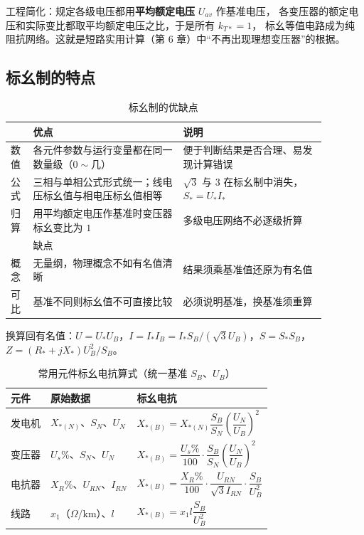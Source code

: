 工程简化：规定各级电压都用\textbf{平均额定电压} $U_{av}$ 作基准电压，
各变压器的额定电压和实际变比都取平均额定电压之比，于是所有 $k_{T*}=1$，
标幺等值电路成为纯阻抗网络。这就是短路实用计算（第 6 章）中“不再出现理想变压器”的根据。

\subsection{标幺制的特点}

\begin{table}[htbp]
  \centering
  \caption{标幺制的优缺点}
  \small
  \begin{tabular}{@{}p{0.06\linewidth}p{0.42\linewidth}p{0.40\linewidth}@{}}
    \toprule
     & 优点 & 说明 \\
    \midrule
    数值 & 各元件参数与运行变量都在同一数量级（$0\sim$几） & 便于判断结果是否合理、易发现计算错误 \\
    公式 & 三相与单相公式形式统一；线电压标幺值与相电压标幺值相等 &
           $\sqrt{3}$ 与 $3$ 在标幺制中消失，$S_*=U_*I_*$ \\
    归算 & 用平均额定电压作基准时变压器标幺变比为 $1$ & 多级电压网络不必逐级折算 \\
    \midrule
     & 缺点 & \\
    \midrule
    概念 & 无量纲，物理概念不如有名值清晰 & 结果须乘基准值还原为有名值 \\
    可比 & 基准不同则标幺值不可直接比较 & 必须说明基准，换基准须重算 \\
    \bottomrule
  \end{tabular}
\end{table}

换算回有名值：$U=U_*U_B$，$I=I_*I_B=I_*S_B/(\sqrt{3}U_B)$，$S=S_*S_B$，
$Z=(R_*+jX_*)U_B^{2}/S_B$。

\begin{table}[htbp]
  \centering
  \caption{常用元件标幺电抗算式（统一基准 $S_B$、$U_B$）}
  \small
  \begin{tabular}{@{}lll@{}}
    \toprule
    元件 & 原始数据 & 标幺电抗 \\
    \midrule
    发电机 & $X_{*(N)}$、$S_N$、$U_N$ & $X_{*(B)}=X_{*(N)}\dfrac{S_B}{S_N}\left(\dfrac{U_N}{U_B}\right)^{2}$ \\
    变压器 & $U_s\%$、$S_N$、$U_N$ & $X_{*(B)}=\dfrac{U_s\%}{100}\cdot\dfrac{S_B}{S_N}\left(\dfrac{U_N}{U_B}\right)^{2}$ \\
    电抗器 & $X_R\%$、$U_{RN}$、$I_{RN}$ & $X_{*(B)}=\dfrac{X_R\%}{100}\cdot\dfrac{U_{RN}}{\sqrt{3}I_{RN}}\cdot\dfrac{S_B}{U_B^{2}}$ \\
    线路 & $x_1$（$\Omega$/km）、$l$ & $X_{*(B)}=x_1l\dfrac{S_B}{U_B^{2}}$ \\
    \bottomrule
  \end{tabular}
\end{table}

